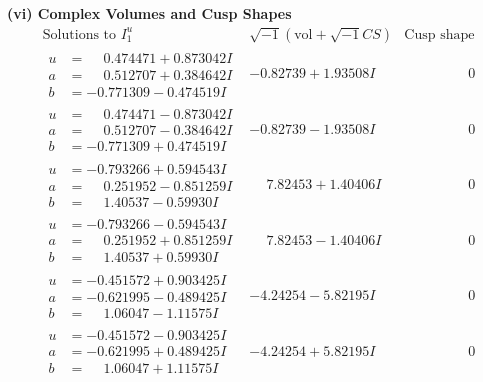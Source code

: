 \documentclass[1p]{elsarticle_modified}
\theoremstyle{definition}
\newcommand{\I}{\sqrt{-1}}
\begin{document}
\newpage\flushleft \textbf{(vi) Complex Volumes and Cusp Shapes}
$$\begin{array}{c|c|c}  
\text{Solutions to }I^u_{1}& \I (\text{vol} + \sqrt{-1}CS) & \text{Cusp shape}\\
 \hline 
\begin{aligned}
u &= \phantom{-}0.474471 + 0.873042 I \\
a &= \phantom{-}0.512707 + 0.384642 I \\
b &= -0.771309 - 0.474519 I\end{aligned}
 & -0.82739 + 1.93508 I & \phantom{-0.000000 } 0 \\ \hline\begin{aligned}
u &= \phantom{-}0.474471 - 0.873042 I \\
a &= \phantom{-}0.512707 - 0.384642 I \\
b &= -0.771309 + 0.474519 I\end{aligned}
 & -0.82739 - 1.93508 I & \phantom{-0.000000 } 0 \\ \hline\begin{aligned}
u &= -0.793266 + 0.594543 I \\
a &= \phantom{-}0.251952 - 0.851259 I \\
b &= \phantom{-}1.40537 - 0.59930 I\end{aligned}
 & \phantom{-}7.82453 + 1.40406 I & \phantom{-0.000000 } 0 \\ \hline\begin{aligned}
u &= -0.793266 - 0.594543 I \\
a &= \phantom{-}0.251952 + 0.851259 I \\
b &= \phantom{-}1.40537 + 0.59930 I\end{aligned}
 & \phantom{-}7.82453 - 1.40406 I & \phantom{-0.000000 } 0 \\ \hline\begin{aligned}
u &= -0.451572 + 0.903425 I \\
a &= -0.621995 - 0.489425 I \\
b &= \phantom{-}1.06047 - 1.11575 I\end{aligned}
 & -4.24254 - 5.82195 I & \phantom{-0.000000 } 0 \\ \hline\begin{aligned}
u &= -0.451572 - 0.903425 I \\
a &= -0.621995 + 0.489425 I \\
b &= \phantom{-}1.06047 + 1.11575 I\end{aligned}
 & -4.24254 + 5.82195 I & \phantom{-0.000000 } 0 \\ \hline\begin{aligned}

\end{aligned}
\end{array}$$
\end{document}
